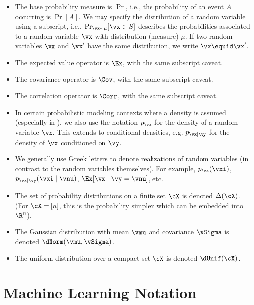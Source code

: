 \begin{itemize}
    \item The base probability measure is \(\Pr\), i.e., the
        probability of an event \(A\) occurring is \(\Pr[A]\). We may
        specify the distribution of a random variable using a
        subscript, i.e., \(\Pr_{\vx \sim \mu}[\vx \in S]\) describes the
        probabilities associated to a random variable $\vx$ with distribution
        (measure) $\mu$. If two random variables $\vx$ and $\vx'$ have the same
        distribution, we write $\vx \equid \vx'$.
    \item The expected value operator is \(\Ex\), with the same
        subscript caveat.
    \item The covariance operator is \(\Cov\), with the same subscript caveat.
    \item The correlation operator is \(\Corr\), with the same subscript caveat.
    \item In certain probabilistic modeling contexts where
        a density is assumed (especially in
        ), we also use the notation
        $p_{\vx}$ for the density of a random variable $\vx$. This extends to
        conditional densities, e.g. $p_{\vx \mid \vy}$ for the density of $\vx$
        conditioned on $\vy$.
    \item We generally use Greek letters to denote
        realizations of random variables (in contrast to the
        random variables themselves). For example, $p_{\vx}(\vxi)$, $p_{\vx \mid
        \vy}(\vxi \mid \vnu)$, $\Ex[\vx \mid \vy=\vnu]$, etc.
    \item The set of probability distributions on a finite set %
        \(\cX\) is denoted
        \(\Delta(\cX)\). (For \(\cX = [n]\), this is the probability
        simplex which can be embedded into \(\R^{n}\)).
    \item The Gaussian distribution with mean \(\vmu\) and covariance
        \(\vSigma\) is denoted \(\dNorm(\vmu, \vSigma)\).
    \item The uniform distribution over a compact set \(\cX\) is
        denoted \(\dUnif(\cX)\).
\end{itemize}



\section*{Machine Learning Notation}

